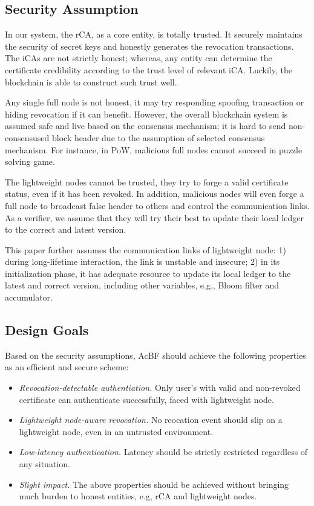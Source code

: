 \documentclass[conference]{IEEEtran}
\begin{document}
\subsection{Security Assumption}
In our system, the rCA, as a core entity, is totally trusted. It securely maintains the security of secret keys and honestly generates the revocation transactions. The iCAs are not strictly honest; whereas, any entity can determine the certificate credibility according to the trust level of relevant iCA. Luckily, the blockchain is able to construct such trust well. 

Any single full node is not honest, it may try responding spoofing transaction or hiding revocation if it can benefit. However, the overall blockchain system is assumed safe and live based on the consensus mechanism; it is hard to send non-consensused block header due to the assumption of selected consensus mechanism. For instance, in PoW, malicious full nodes cannot succeed in puzzle solving game.

The lightweight nodes cannot be trusted, they try to forge a valid certificate status, even if it has been revoked. In addition, malicious nodes will even forge a full node to broadcast false header to others and control the communication links. As a verifier, we assume that they will try their best to update their local ledger to the correct and latest version. 

This paper further assumes the communication links of lightweight node: 1) during long-lifetime interaction, the link is unstable and insecure; 2) in its initialization phase, it has adequate resource to update its local ledger to the latest and correct version, including other variables, e.g., Bloom filter and accumulator.

\subsection{Design Goals}
Based on the security assumptions, AcBF should achieve the following properties as an efficient and secure scheme:  
\begin{itemize}
	\item \textit{Revocation-detectable authentiation.} Only user's with valid and non-revoked certificate can authenticate successfully, faced with lightweight node.
	\item \textit{Lightweight node-aware revocation.} No reocation event should slip on a lightweight node, even in an untrusted environment. 
	\item \textit{Low-latency authentication.} Latency should be strictly restricted regardless of any situation. 
	\item \textit{Slight impact.} The above properties should be achieved without bringing much burden to honest entities, e.g, rCA and lightweight nodes.
\end{itemize}
\end{document}

